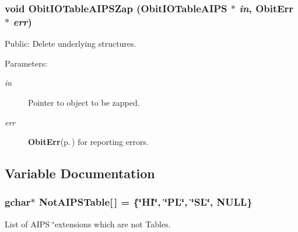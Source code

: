 \subsubsection{\setlength{\rightskip}{0pt plus 5cm}void Obit\-IOTable\-AIPSZap ({\bf Obit\-IOTable\-AIPS} $\ast$ {\em in}, {\bf Obit\-Err} $\ast$ {\em err})}\label{ObitIOTableAIPS_8c_a12}


Public: Delete underlying structures. 

\begin{Desc}
\item[Parameters:]
\begin{description}
\item[{\em in}]Pointer to object to be zapped. \item[{\em err}]{\bf Obit\-Err}{\rm (p.\,\pageref{structObitErr})} for reporting errors. \end{description}
\end{Desc}


\subsection{Variable Documentation}
\subsubsection{\setlength{\rightskip}{0pt plus 5cm}gchar$\ast$ {\bf Not\-AIPSTable}[$\,$] = \{\char`\"{}HI\char`\"{}, \char`\"{}PL\char`\"{}, \char`\"{}SL\char`\"{}, NULL\}}\label{ObitIOTableAIPS_8c_a2}


List of AIPS \char`\"{}extensions which are not Tables. 

